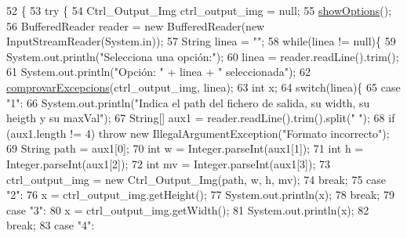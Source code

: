 \begin{DoxyCode}
52                                            \{
53     \textcolor{keywordflow}{try} \{
54         Ctrl\_Output\_Img ctrl\_output\_img = null;
55         \hyperlink{classpersistencia_1_1output_1_1Driver____Ctrl__Output__Img_a407a2c1e80b099b7cae5dd0a19683d09}{showOptions}();
56         BufferedReader reader = \textcolor{keyword}{new} BufferedReader(\textcolor{keyword}{new} InputStreamReader(System.in));
57         String linea = \textcolor{stringliteral}{""};
58         \textcolor{keywordflow}{while}(linea != null)\{
59             System.out.println(\textcolor{stringliteral}{"Selecciona una opción:"});
60             linea = reader.readLine().trim();
61             System.out.println(\textcolor{stringliteral}{"Opción: "} + linea + \textcolor{stringliteral}{" seleccionada"});
62             \hyperlink{classpersistencia_1_1output_1_1Driver____Ctrl__Output__Img_ab6af9c875a2582dbb7e466be9bb6bbbb}{comprovarExcepcions}(ctrl\_output\_img, linea);
63             \textcolor{keywordtype}{int} x;
64             \textcolor{keywordflow}{switch}(linea)\{
65                 \textcolor{keywordflow}{case} \textcolor{stringliteral}{"1"}:
66                     System.out.println(\textcolor{stringliteral}{"Indica el path del fichero de salida, su width, su heigth y su
       maxVal"});
67                     String[] aux1 = reader.readLine().trim().split(\textcolor{stringliteral}{" "});
68                     \textcolor{keywordflow}{if} (aux1.length != 4) \textcolor{keywordflow}{throw} \textcolor{keyword}{new} IllegalArgumentException(\textcolor{stringliteral}{"Formato incorrecto"});
69                     String path = aux1[0];
70                     \textcolor{keywordtype}{int} w = Integer.parseInt(aux1[1]);
71                     \textcolor{keywordtype}{int} h = Integer.parseInt(aux1[2]);
72                     \textcolor{keywordtype}{int} mv = Integer.parseInt(aux1[3]);
73                     ctrl\_output\_img = \textcolor{keyword}{new} Ctrl\_Output\_Img(path, w, h, mv);
74                 \textcolor{keywordflow}{break};
75                 \textcolor{keywordflow}{case} \textcolor{stringliteral}{"2"}:
76                     x = ctrl\_output\_img.getHeight();
77                     System.out.println(x);
78                 \textcolor{keywordflow}{break};
79                 \textcolor{keywordflow}{case} \textcolor{stringliteral}{"3"}:
80                     x = ctrl\_output\_img.getWidth();
81                     System.out.println(x);
82                 \textcolor{keywordflow}{break};
83                 \textcolor{keywordflow}{case} \textcolor{stringliteral}{"4"}:

\end{DoxyCode}
